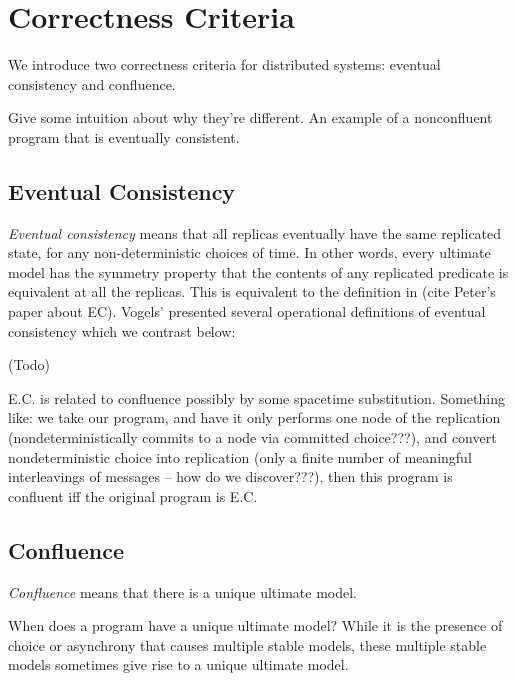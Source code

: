 \section{Correctness Criteria}

We introduce two correctness criteria for distributed systems: eventual consistency and confluence.

Give some intuition about why they're different.  An example of a nonconfluent program that is eventually consistent.

\subsection{Eventual Consistency}

{\em Eventual consistency} means that all replicas eventually have the same replicated state, for any non-deterministic choices of time.  In other words, every ultimate model has the symmetry property that the contents of any replicated predicate is equivalent at all the replicas.  This is equivalent to the definition in (cite Peter's paper about EC).  Vogels' presented several operational definitions of eventual consistency which we contrast below:

(Todo)

E.C. is related to confluence possibly by some spacetime substitution.  Something like: we take our program, and have it only performs one node of the replication (nondeterministically commits to a node via committed choice???), and convert nondeterministic choice into replication (only a finite number of meaningful interleavings of messages -- how do we discover???), then this program is confluent iff the original program is E.C.

\subsection{Confluence}

{\em Confluence} means that there is a unique ultimate model.

When does a \lang program have a unique ultimate model?  While it is the presence of choice or asynchrony that causes multiple stable models, these multiple stable models sometimes give rise to a unique ultimate model.

